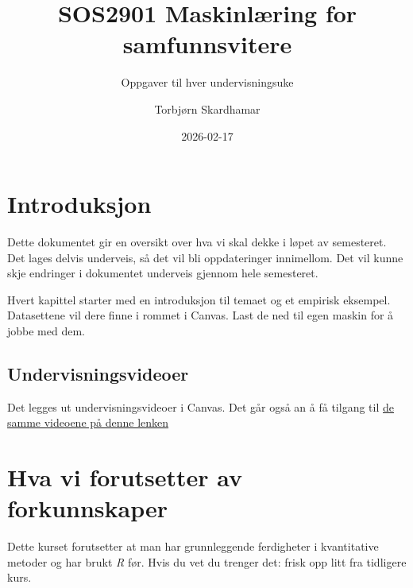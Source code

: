 \documentclass[
  letterpaper,
  DIV=11,
  numbers=noendperiod]{scrreprt}
\title{SOS2901 Maskinlæring for samfunnsvitere}
\subtitle{Oppgaver til hver undervisningsuke}
\author{Torbjørn Skardhamar}
\date{2026-02-17}
\renewcommand*\contentsname{Table of contents}
\newcommand\contentsname{Table of contents}
\begin{document}
\maketitle

\renewcommand*\contentsname{Table of contents}
{
\hypersetup{linkcolor=}
\setcounter{tocdepth}{2}
\tableofcontents
}


\chapter*{Introduksjon}\label{introduksjon}


Dette dokumentet gir en oversikt over hva vi skal dekke i løpet av
semesteret. Det lages delvis underveis, så det vil bli oppdateringer
innimellom. Det vil kunne skje endringer i dokumentet underveis gjennom
hele semesteret.

Hvert kapittel starter med en introduksjon til temaet og et empirisk
eksempel. Datasettene vil dere finne i rommet i Canvas. Last de ned til
egen maskin for å jobbe med dem.

\section*{Undervisningsvideoer}\label{undervisningsvideoer}


Det legges ut undervisningsvideoer i Canvas. Det går også an å få
tilgang til
\href{https://uio.cloud.panopto.eu/Panopto/Pages/Sessions/List.aspx?folderID=fbd0aeb4-f162-4681-977b-af8e0137df63}{de
samme videoene på denne lenken}


\chapter*{Hva vi forutsetter av
forkunnskaper}\label{hva-vi-forutsetter-av-forkunnskaper}


Dette kurset forutsetter at man har grunnleggende ferdigheter i
kvantitative metoder og har brukt \emph{R} før. Hvis du vet du trenger
det: frisk opp litt fra tidligere kurs.
\end{document}
